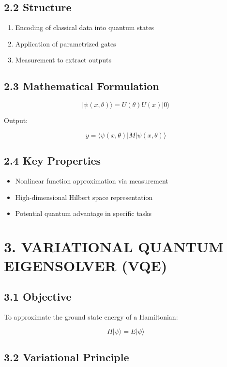 \subsection*{2.2 Structure}

\begin{enumerate}
\item Encoding of classical data into quantum states
\item Application of parametrized gates
\item Measurement to extract outputs
\end{enumerate}

\subsection*{2.3 Mathematical Formulation}

\[
|\psi(x, \theta)\rangle = U(\theta) U(x) |0\rangle
\]

Output:

\[
y = \langle \psi(x, \theta) | M | \psi(x, \theta) \rangle
\]

\subsection*{2.4 Key Properties}

\begin{itemize}
\item Nonlinear function approximation via measurement
\item High-dimensional Hilbert space representation
\item Potential quantum advantage in specific tasks
\end{itemize}

\vspace{0.5cm}

\section*{3. VARIATIONAL QUANTUM EIGENSOLVER (VQE)}

\subsection*{3.1 Objective}

To approximate the ground state energy of a Hamiltonian:

\[
H |\psi\rangle = E |\psi\rangle
\]

\subsection*{3.2 Variational Principle}

